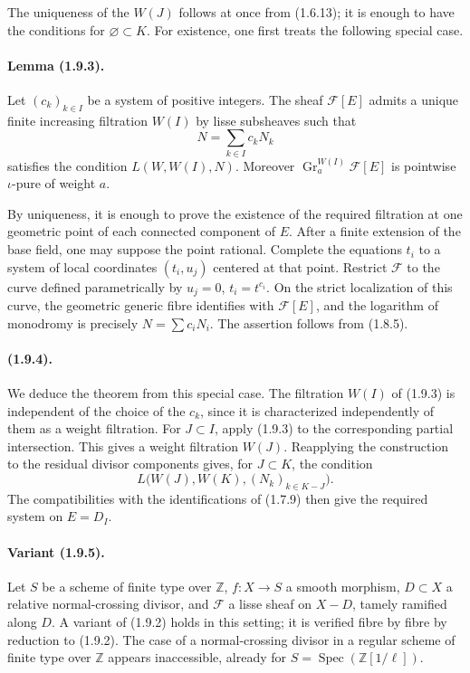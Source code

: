 \documentclass[11pt]{article}
\theoremstyle{remark}
\newcommand{\ZZ}{\mathbb{Z}}
\newcommand{\Spec}{\operatorname{Spec}}
\newcommand{\Gr}{\operatorname{Gr}}
\begin{document}
The uniqueness of the \(W(J)\) follows at once from (1.6.13); it is enough to have the conditions for \(\varnothing\subset K\). For existence, one first treats the following special case.

\paragraph{Lemma (1.9.3).}
Let \((c_k)_{k\in I}\) be a system of positive integers. The sheaf \(\mathcal F[E]\) admits a unique finite increasing filtration \(W(I)\) by lisse subsheaves such that
\[
N=\sum_{k\in I}c_kN_k
\]
satisfies the condition \(L(W,W(I),N)\). Moreover \(\Gr^{W(I)}_a\mathcal F[E]\) is pointwise \(\iota\)-pure of weight \(a\).

By uniqueness, it is enough to prove the existence of the required filtration at one geometric point of each connected component of \(E\). After a finite extension of the base field, one may suppose the point rational. Complete the equations \(t_i\) to a system of local coordinates \((t_i,u_j)\) centered at that point. Restrict \(\mathcal F\) to the curve defined parametrically by \(u_j=0\), \(t_i=t^{c_i}\). On the strict localization of this curve, the geometric generic fibre identifies with \(\mathcal F[E]\), and the logarithm of monodromy is precisely \(N=\sum c_iN_i\). The assertion follows from (1.8.5).

\paragraph{(1.9.4).}
We deduce the theorem from this special case. The filtration \(W(I)\) of (1.9.3) is independent of the choice of the \(c_k\), since it is characterized independently of them as a weight filtration. For \(J\subset I\), apply (1.9.3) to the corresponding partial intersection. This gives a weight filtration \(W(J)\). Reapplying the construction to the residual divisor components gives, for \(J\subset K\), the condition
\[
L\bigl(W(J),W(K),(N_k)_{k\in K-J}\bigr).
\]
The compatibilities with the identifications of (1.7.9) then give the required system on \(E=D_I\).

\paragraph{Variant (1.9.5).}
Let \(S\) be a scheme of finite type over \(\ZZ\), \(f:X\to S\) a smooth morphism, \(D\subset X\) a relative normal-crossing divisor, and \(\mathcal F\) a lisse sheaf on \(X-D\), tamely ramified along \(D\). A variant of (1.9.2) holds in this setting; it is verified fibre by fibre by reduction to (1.9.2). The case of a normal-crossing divisor in a regular scheme of finite type over \(\ZZ\) appears inaccessible, already for \(S=\Spec(\ZZ[1/\ell])\).
\end{document}
